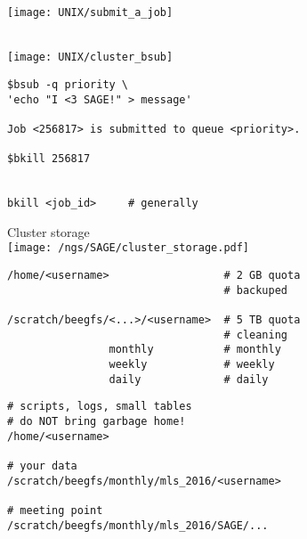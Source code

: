 \documentclass[xcolor=dvipsnames]{beamer}
\begin{document}
\begin{frame}
	\begin{center}
		\texttt{[image: UNIX/submit\_a\_job]}
	\end{center}
\end{frame}

\begin{frame}
	\begin{center}
		\Huge
		~\\
		\vspace{1cm}
		\texttt{[image: UNIX/cluster\_bsub]}
	\end{center}
\end{frame}

\begin{frame}[fragile]
\large
\begin{verbatim}
$bsub -q priority \
'echo "I <3 SAGE!" > message'

Job <256817> is submitted to queue <priority>.

$bkill 256817


bkill <job_id>     # generally
\end{verbatim}
\end{frame}

\begin{frame}
	\begin{center}	
		\Huge
		Cluster storage\\
		\vspace{1cm}
		\texttt{[image: /ngs/SAGE/cluster\_storage.pdf]}
	\end{center}
\end{frame}

\begin{frame}[fragile]
\large
\begin{verbatim}
/home/<username>                  # 2 GB quota
                                  # backuped
                                  
/scratch/beegfs/<...>/<username>  # 5 TB quota
                                  # cleaning
                monthly           # monthly
                weekly            # weekly
                daily             # daily
\end{verbatim}
\end{frame}

\begin{frame}[fragile]
\large
\begin{verbatim}
# scripts, logs, small tables
# do NOT bring garbage home!
/home/<username>						

# your data
/scratch/beegfs/monthly/mls_2016/<username>	

# meeting point
/scratch/beegfs/monthly/mls_2016/SAGE/...    
\end{verbatim}
\end{frame}
\end{document}
